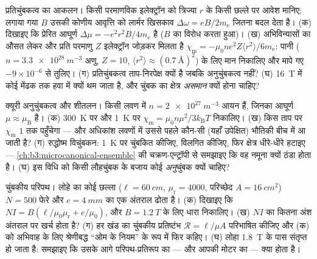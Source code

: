 \begin{exercise}[$\star\star$]\label{exo:b3:electromagnetism-in-matter:8}
प्रतिचुंबकत्व का आकलन। किसी परमाणविक इलेक्ट्रॉन को त्रिज्या $r$ के
किसी छल्ले पर आवेश मानिए; लगाया गया $B$ उसकी कोणीय आवृत्ति को
लार्मर खिसकाव $\Delta\omega = eB/2m_{\text{e}}$ जितना बदल देता है।
(क) दिखाइए कि प्रेरित आघूर्ण $\Delta\mu = -e^2r^2B/4m_{\text{e}}$ है
($B$ का विरोध करता हुआ)। (ख) अभिविन्यासों का औसत लेकर और प्रति
परमाणु $Z$ इलेक्ट्रॉन जोड़कर मिलता है $\chi_{\text{m}} = -\mu_0ne^2Z\langle
r^2\rangle/6m_{\text{e}}$: पानी ($n =
\qty{3.3e28}{m^{-3}}$ अणु, $Z = 10$, $\langle r^2\rangle
\approx (\qty{0.7}{\angstrom})^2$) के लिए मान निकालिए और मापे गए
$-9\times10^{-6}$ से तुलिए। (ग) प्रतिचुंबकत्व ताप-निरपेक्ष क्यों है
जबकि अनुचुंबकत्व नहीं? (घ) \qty{16}{T} में कोई मेंढक तक हवा में
क्यों थम जाता है, और चुंबक का क्षेत्र \emph{असमान} क्यों होना चाहिए?
\end{exercise}

\begin{exercise}[$\star\star$]\label{exo:b3:electromagnetism-in-matter:9}
क्यूरी अनुचुंबकत्व और शीतलन। किसी लवण में $n =
\qty{2e27}{m^{-3}}$ आयन हैं, जिनका आघूर्ण $\mu \approx \mu_{\text{B}}$ है।
(क) \qty{300}{K} पर और \qty{1}{K} पर
$\chi_{\text{m}} = \mu_0n\mu^2/3k_{\text{B}}T$ निकालिए। (ख) किस ताप
पर $\chi_{\text{m}}$ $1$ तक पहुँचेगा --- और अधिकांश लवणों में उससे
पहले कौन-सी (यहाँ उपेक्षित) भौतिकी बीच में आ जाती है? (ग) रुद्धोष्म
विचुंबकन: \qty{1}{K} पर चुंबकित कीजिए, विलगित कीजिए, फिर क्षेत्र
धीरे-धीरे हटाइए --- \cref{ch:b3:microcanonical-ensemble} की
चक्रण-एन्ट्रॉपी से समझाइए कि वह नमूना क्यों ठंडा होता है। (घ) इस
विधि को किसी लौहचुंबक के बजाय कोई \emph{अनु}चुंबक क्यों चाहिए?
\end{exercise}

\begin{exercise}[$\star\star\star$]\label{exo:b3:electromagnetism-in-matter:10}
चुंबकीय परिपथ। लोहे का कोई छल्ला ($\ell = \qty{60}{cm}$,
$\mu_{\text{r}} = 4000$, परिच्छेद $A = \qty{16}{cm^2}$)
$N = 500$ फेरे और $e = \qty{4}{mm}$ का एक अंतराल ढोता है। (क)
दिखाइए कि $NI =
B(\ell/\mu_0\mu_{\text{r}} + e/\mu_0)$, और
$B = \qty{1.2}{T}$ के लिए धारा निकालिए। (ख) $NI$ का कितना अंश अंतराल
पर खर्च होता है? (ग) हर खंड का चुंबकीय प्रतिष्टंभ
$\mathcal R = \ell/\mu A$ परिभाषित कीजिए और (क) को अभिवाह के लिए
श्रेणीबद्ध ``ओम के नियम'' के रूप में फिर कहिए। (घ)
लोहा \qty{1.8}{T} के पास संतृप्त हो जाता है: समझाइए कि उसके आगे
परिपथ-प्रतिरूप का --- और आपकी मोटर का --- क्या होता है।
\end{exercise}

